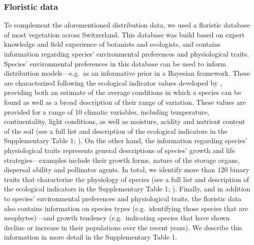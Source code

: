 \documentclass[11pt, a4paper]{article}
\begin{document}
\subsubsection*{Floristic data}
To complement the aforementioned distribution data, we used a floristic database of most vegetation across Switzerland. This database was build based on expert knowledge and field experience of botanists and ecologists, and contains information regarding species' environmental preferences and physiological traits. Species' environmental preferences in this database can be used to inform distribution models---e.g.~as an informative prior in a Bayesian framework. These are characterized following the ecological indicator values developed by \citet{landoltFloraIndicativaOkologische2010}, providing both an estimate of the average conditions in which a species can be found as well as a broad description of their range of variation. These values are provided for a range of 10 climatic variables, including temperature, continentality, light conditions, as well as moisture, acidity and nutrient content of the soil (see a full list and description of the ecological indicators in the Supplementary Table 1; \citealt{landoltFloraIndicativaOkologische2010}). On the other hand, the information regarding species' physiological traits represents general descriptions of species' growth and life strategies---examples include their growth forms, nature of the storage organs, dispersal ability and pollinator agents. In total, we identify more than $120$ binary traits that characterize the physiology of species (see a full list and description of the ecological indicators in the Supplementary Table 1; \citealt{landoltFloraIndicativaOkologische2010}). Finally, and in addition to species' environmental preferences and physiological traits, the floristic data also contains information on species types (e.g.~identifying those species that are neophytes)---and growth tendency (e.g.~indicating species that have shown decline or increase in their populations over the recent years). We describe this information in more detail in the Supplementary Table 1.


\end{document}
